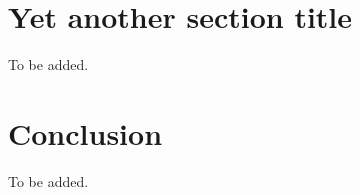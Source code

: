 \documentclass[article]{aaltoseries}
\begin{document}


\section{Yet another section title}

To be added.




\section{Conclusion}

To be added.






\end{document}
